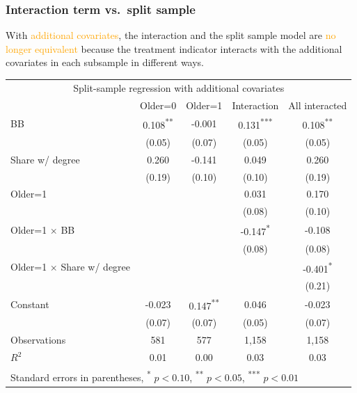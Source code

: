 \documentclass[12pt,english,dvipsnames,aspectratio=169,handout]{beamer}\usepackage[]{graphicx}\usepackage[]{xcolor}
\begin{document}
\begin{frame}
  \frametitle{Interaction term vs.\ split sample}
\footnotesize
With \textcolor{orange}{additional covariates}, the interaction and the split sample model are \textcolor{orange}{no longer equivalent} because the treatment indicator interacts with the additional covariates in each subsample in different ways. 

\tiny
\centering
\begin{tabular}{l*{4}{c}}
\toprule
\multicolumn{5}{c}{Split-sample regression with additional covariates}\\
                & Older=0         & Older=1           &  Interaction  & All interacted \\
\midrule
BB              &    0.108\textsuperscript{**} &   -0.001         &    0.131\textsuperscript{***}&    0.108\textsuperscript{**} \\
                &   (0.05)         &   (0.07)         &   (0.05)         &   (0.05)         \\
Share w/ degree &    0.260         &   -0.141         &    0.049         &    0.260         \\
                &   (0.19)         &   (0.10)         &   (0.10)         &   (0.19)         \\
Older=1         &                  &                  &    0.031         &    0.170         \\
                &                  &                  &   (0.08)         &   (0.10)         \\
Older=1 $\times$ BB&               &                  &   -0.147\textsuperscript{*}  &   -0.108         \\
                &                  &                  &   (0.08)         &   (0.08)         \\
Older=1 $\times$ Share w/ degree&                  &                  &                  &   -0.401\textsuperscript{*}  \\
                &                  &                  &                  &   (0.21)         \\
Constant        &   -0.023         &    0.147\textsuperscript{**} &    0.046         &   -0.023         \\
                &   (0.07)         &   (0.07)         &   (0.05)         &   (0.07)         \\
\midrule
Observations    &      581         &      577         &     1,158         &     1,158         \\
\(R^{2}\)       &     0.01         &     0.00         &     0.03         &     0.03         \\
\bottomrule
\multicolumn{5}{l}{Standard errors in parentheses, \textsuperscript{*} \(p<0.10\), \textsuperscript{**} \(p<0.05\), \textsuperscript{***} \(p<0.01\)}\\
\end{tabular}

\end{frame}
\end{document}
